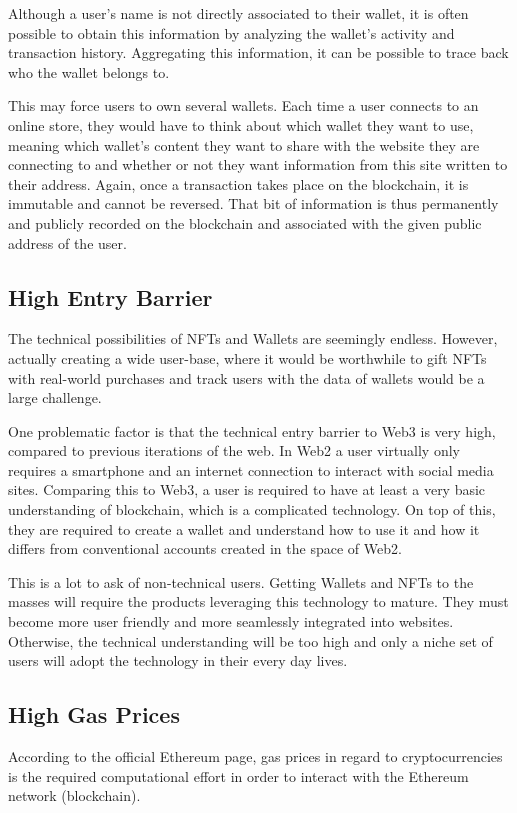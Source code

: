 Although a user's name is not directly associated to their wallet, it is often possible to obtain this information by analyzing the wallet's activity and transaction history. Aggregating this information, it can be possible to trace back who the wallet belongs to.

This may force users to own several wallets. Each time a user connects to an online store, they would have to think about which wallet they want to use, meaning which wallet's content they want to share with the website they are connecting to and whether or not they want information from this site written to their address. Again, once a transaction takes place on the blockchain, it is immutable and cannot be reversed. That bit of information is thus permanently and publicly recorded on the blockchain and associated with the given public address of the user.


%
%
\subsection{High Entry Barrier}
\label{sub:results:barrier}
The technical possibilities of NFTs and Wallets are seemingly endless. However, actually creating a wide user-base, where it would be worthwhile to gift NFTs with real-world purchases and track users with the data of wallets would be a large challenge.

One problematic factor is that the technical entry barrier to Web3 is very high, compared to previous iterations of the web. In Web2 a user virtually only requires a smartphone and an internet connection to interact with social media sites. Comparing this to Web3, a user is required to have at least a very basic understanding of blockchain, which is a complicated technology. On top of this, they are required to create a wallet and understand how to use it and how it differs from conventional accounts created in the space of Web2.

This is a lot to ask of non-technical users. Getting Wallets and NFTs to the masses will require the products leveraging this technology to mature. They must become more user friendly and more seamlessly integrated into websites. Otherwise, the technical understanding will be too high and only a niche set of users will adopt the technology in their every day lives.

%
%
\subsection{High Gas Prices}
\label{sub:results:barrier}
According to the official Ethereum page, gas prices in regard to cryptocurrencies is the required computational effort in order to interact with the Ethereum network (blockchain). \cite{ether}

